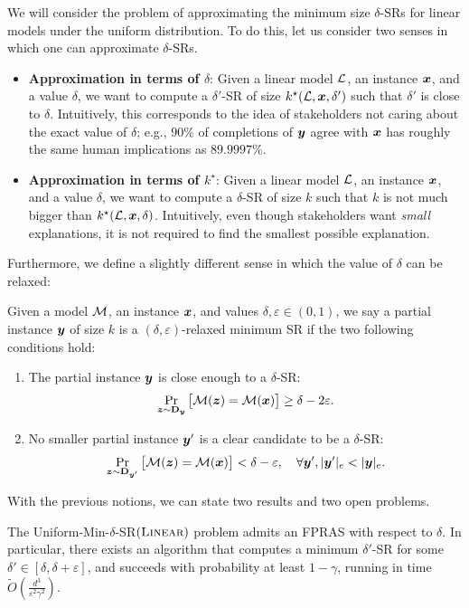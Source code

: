 We will consider the problem of approximating the minimum size $\delta$-SRs for linear models under the uniform distribution. To do this, let us consider two senses in which one can approximate $\delta$-SRs.
\begin{itemize}
    \item \textbf{Approximation in terms of $\delta$}: Given a linear model $\mathcal{L}$, an instance ${\bm{x}}$, and a value $\delta$, we want to compute a $\delta'$-SR of size $k^\star(\mathcal{L}, {\bm{x}}, \delta')$ such that $\delta'$ is close to $\delta$. Intuitively, this corresponds to the idea of stakeholders not caring about the exact value of $\delta$; e.g., $90\%$ of completions of ${\bm{y}}$ agree with ${\bm{x}}$ has roughly the same human implications as $89.9997\%$.
    \item \textbf{Approximation in terms of $k^\star$}: Given a linear model $\mathcal{L}$, an instance ${\bm{x}}$, and a value $\delta$, we want to compute a $\delta$-SR of size $k$ such that $k$ is not much bigger than $k^\star(\mathcal{L}, {\bm{x}}, \delta)$. Intuitively, even though stakeholders want \emph{small} explanations, it is not required to find the smallest possible explanation.
\end{itemize}

Furthermore, we define a slightly different sense in which the value of $\delta$ can be relaxed:

\begin{definition}
    Given a model $\mathcal{M}$, an instance ${\bm{x}}$, and values $\delta, \varepsilon \in (0, 1)$, we say a partial instance ${\bm{y}}$ of size $k$ is a $(\delta, \varepsilon)$-relaxed minimum SR if the two following conditions hold:
    \begin{enumerate}
        \item The partial instance ${\bm{y}}$ is close enough to a $\delta$-SR:
        \[
            \Pr_{{\bm{z}} \sim \mathbf{D}_{{\bm{y}}}}\big[\mathcal{M}({\bm{z}}) = \mathcal{M}({\bm{x}})\big] \geq \delta - 2\varepsilon.
        \]
        \item No smaller partial instance ${\bm{y}}'$ is a clear candidate to be a $\delta$-SR:
        \[
            \Pr_{{\bm{z}} \sim \mathbf{D}_{{\bm{y}}'}}\big[\mathcal{M}({\bm{z}}) = \mathcal{M}({\bm{x}})\big] < \delta - \varepsilon, \quad \forall {\bm{y}}', |{\bm{y}}'|_e < |{\bm{y}}|_e.
        \]
    \end{enumerate}
\end{definition}


With the previous notions, we can state two results and two open problems.
\begin{theorem}\label{thm:delta-approximation}
    The Uniform-Min-$\delta$-SR$(\textsc{Linear})$ problem admits an FPRAS with respect to $\delta$. In particular, there exists an algorithm that computes a minimum $\delta'$-SR for some $\delta' \in [\delta, \delta + \varepsilon]$, and succeeds with probability at least $1-\gamma$, running in time $\tilde{O}\left(\frac{d^3}{\varepsilon^2\gamma^2}\right)$.
\end{theorem}

